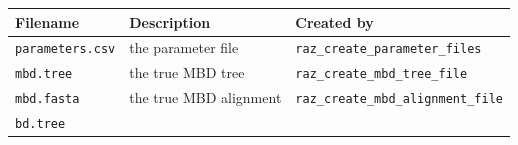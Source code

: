 \documentclass[]{article}
\begin{document}
\begin{longtable}[]{@{}lll@{}}
\toprule
\begin{minipage}[b]{0.16\columnwidth}\raggedright\strut
Filename\strut
\end{minipage} & \begin{minipage}[b]{0.45\columnwidth}\raggedright\strut
Description\strut
\end{minipage} & \begin{minipage}[b]{0.30\columnwidth}\raggedright\strut
Created by\strut
\end{minipage}\tabularnewline
\midrule
\endhead
\begin{minipage}[t]{0.16\columnwidth}\raggedright\strut
\texttt{parameters.csv}\strut
\end{minipage} & \begin{minipage}[t]{0.45\columnwidth}\raggedright\strut
the parameter file\strut
\end{minipage} & \begin{minipage}[t]{0.30\columnwidth}\raggedright\strut
\texttt{raz\_create\_parameter\_files}\strut
\end{minipage}\tabularnewline
\begin{minipage}[t]{0.16\columnwidth}\raggedright\strut
\texttt{mbd.tree}\strut
\end{minipage} & \begin{minipage}[t]{0.45\columnwidth}\raggedright\strut
the true MBD tree\strut
\end{minipage} & \begin{minipage}[t]{0.30\columnwidth}\raggedright\strut
\texttt{raz\_create\_mbd\_tree\_file}\strut
\end{minipage}\tabularnewline
\begin{minipage}[t]{0.16\columnwidth}\raggedright\strut
\texttt{mbd.fasta}\strut
\end{minipage} & \begin{minipage}[t]{0.45\columnwidth}\raggedright\strut
the true MBD alignment\strut
\end{minipage} & \begin{minipage}[t]{0.30\columnwidth}\raggedright\strut
\texttt{raz\_create\_mbd\_alignment\_file}\strut
\end{minipage}\tabularnewline
\begin{minipage}[t]{0.16\columnwidth}\raggedright\strut
\texttt{bd.tree}\strut
\end{minipage} & \begin{minipage}[t]{0.45\columnwidth}\raggedright\strut

\end{minipage}
\end{longtable}
\end{document}
